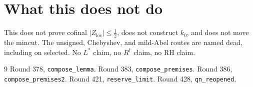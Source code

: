 \documentclass[11pt]{article}
\theoremstyle{remark}
\newcommand{\Zloc}{Z_{\mathrm{loc}}}
\begin{document}
\section{What this does not do}\label{sec:not}

This does not prove cofinal $\lvert\Zloc\rvert\le\tfrac12$,
does not construct $k_0$, and does not
move the mincut.
The unsigned, Chebyshev, and mild-Abel
routes are named dead, including on
selected.
No $L^{*}$ claim, no $R^{\dagger}$ claim, no RH claim.

\begin{thebibliography}{9}
 Round 378, \texttt{compose\_lemma}.
 Round 383, \texttt{compose\_premises}.
 Round 386, \texttt{compose\_premises2}.
 Round 421, \texttt{reserve\_limit}.
 Round 428, \texttt{qn\_reopened}.
\end{thebibliography}
\end{document}
